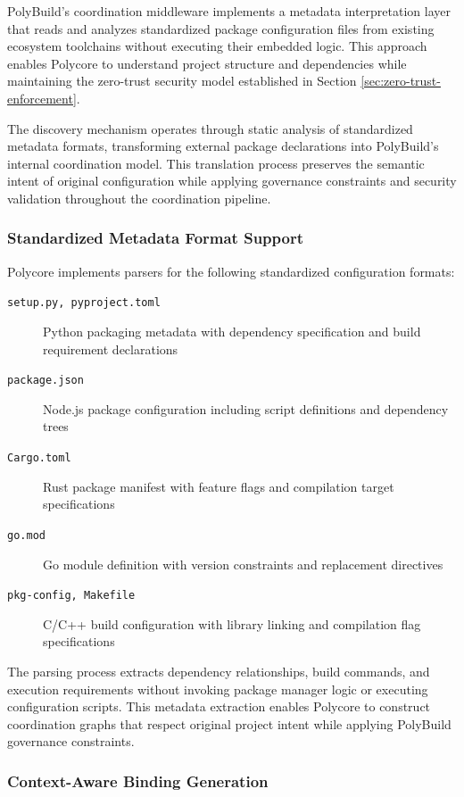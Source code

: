 PolyBuild's coordination middleware implements a metadata interpretation layer that reads and analyzes standardized package configuration files from existing ecosystem toolchains without executing their embedded logic. This approach enables Polycore to understand project structure and dependencies while maintaining the zero-trust security model established in Section \ref{sec:zero-trust-enforcement}.

The discovery mechanism operates through static analysis of standardized metadata formats, transforming external package declarations into PolyBuild's internal coordination model. This translation process preserves the semantic intent of original configuration while applying governance constraints and security validation throughout the coordination pipeline.

\subsubsection{Standardized Metadata Format Support}

Polycore implements parsers for the following standardized configuration formats:

\begin{description}
\item[\texttt{setup.py, pyproject.toml}] Python packaging metadata with dependency specification and build requirement declarations
\item[\texttt{package.json}] Node.js package configuration including script definitions and dependency trees
\item[\texttt{Cargo.toml}] Rust package manifest with feature flags and compilation target specifications
\item[\texttt{go.mod}] Go module definition with version constraints and replacement directives
\item[\texttt{pkg-config, Makefile}] C/C++ build configuration with library linking and compilation flag specifications
\end{description}

The parsing process extracts dependency relationships, build commands, and execution requirements without invoking package manager logic or executing configuration scripts. This metadata extraction enables Polycore to construct coordination graphs that respect original project intent while applying PolyBuild governance constraints.

\subsubsection{Context-Aware Binding Generation}

